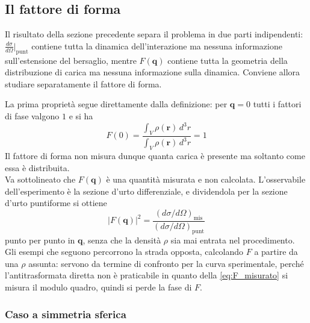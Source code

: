 \subsection{Il fattore di forma}

Il risultato della sezione precedente separa il problema in due parti indipendenti: $\frac{d\sigma}{d\Omega}\big|_{\text{punt}}$ contiene tutta la dinamica dell'interazione ma nessuna informazione sull'estensione del bersaglio, mentre $F(\mathbf{q})$ contiene tutta la geometria della distribuzione di carica ma nessuna informazione sulla dinamica. Conviene allora studiare separatamente il fattore di forma.

La prima proprietà segue direttamente dalla definizione: per $\mathbf{q} = 0$ tutti i fattori di fase valgono $1$ e si ha
\begin{equation}
    F(0) = \frac{\int_V \rho(\mathbf{r})\,d^3r}{\int_V \rho(\mathbf{r})\,d^3r} = 1
    \label{eq:F_zero}
\end{equation}
Il fattore di forma non misura dunque quanta carica è presente ma soltanto come essa è distribuita.\\

Va sottolineato che $F(\mathbf{q})$ è una quantità misurata e non calcolata. L'osservabile dell'esperimento è la sezione d'urto differenziale, e dividendola per la sezione d'urto puntiforme si ottiene
\begin{equation}
    \left|F(\mathbf{q})\right|^2 = \frac{\left(d\sigma/d\Omega\right)_{\text{mis}}}{\left(d\sigma/d\Omega\right)_{\text{punt}}}
    \label{eq:F_misurato}
\end{equation}
punto per punto in $\mathbf{q}$, senza che la densità $\rho$ sia mai entrata nel procedimento. Gli esempi che seguono percorrono la strada opposta, calcolando $F$ a partire da una $\rho$ assunta: servono da termine di confronto per la curva sperimentale, perché l'antitrasformata diretta non è praticabile in quanto della \eqref{eq:F_misurato} si misura il modulo quadro, quindi si perde la fase di $F$.

\subsubsection*{Caso a simmetria sferica}

